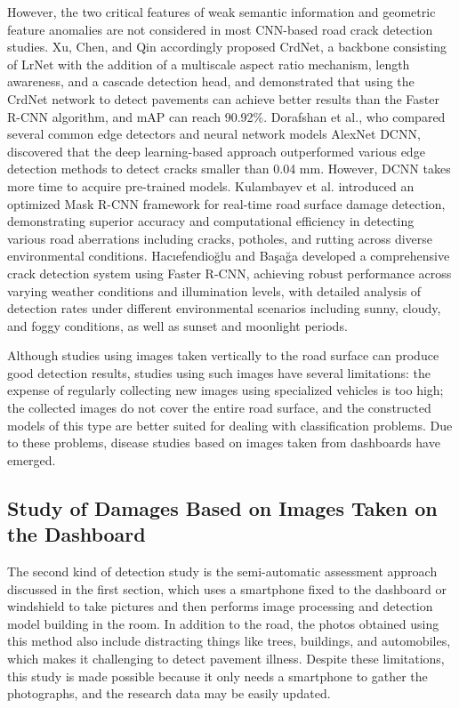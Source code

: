 \documentclass[sensors,article,submit,moreauthors]{Definitions/mdpi}
\begin{document}
    However, the two critical features of weak semantic information and geometric feature anomalies are not considered in most CNN-based road crack detection studies. Xu, Chen, and Qin\citep{xu2021cnn} accordingly proposed CrdNet, a backbone consisting of LrNet\citep{sun2021improving} with the addition of a multiscale aspect ratio mechanism, length awareness, and a cascade detection head, and demonstrated that using the CrdNet network to detect pavements can achieve better results than the Faster R-CNN algorithm\citep{ren2015faster}, and mAP can reach 90.92\%. Dorafshan et al.\citep{dorafshan2018comparison}, who compared several common edge detectors and neural network models AlexNet DCNN\citep{lecun1998gradient}, discovered that the deep learning-based approach outperformed various edge detection methods to detect cracks smaller than 0.04 mm. However, DCNN takes more time to acquire pre-trained models. Kulambayev et al.\citep{kulambayev2023real} introduced an optimized Mask R-CNN framework for real-time road surface damage detection, demonstrating superior accuracy and computational efficiency in detecting various road aberrations including cracks, potholes, and rutting across diverse environmental conditions. Hacıefendioğlu and Başağa\citep{haciefendiouglu2022concrete} developed a comprehensive crack detection system using Faster R-CNN, achieving robust performance across varying weather conditions and illumination levels, with detailed analysis of detection rates under different environmental scenarios including sunny, cloudy, and foggy conditions, as well as sunset and moonlight periods.


    Although studies using images taken vertically to the road surface can produce good detection results, studies using such images have several limitations: the expense of regularly collecting new images using specialized vehicles is too high; the collected images do not cover the entire road surface, and the constructed models of this type are better suited for dealing with classification problems. Due to these problems, disease studies based on images taken from dashboards have emerged.

    \subsection{Study of Damages Based on Images Taken on the Dashboard}


    The second kind of detection study is the semi-automatic assessment approach discussed in the first section, which uses a smartphone fixed to the dashboard or windshield to take pictures and then performs image processing and detection model building in the room. In addition to the road, the photos obtained using this method also include distracting things like trees, buildings, and automobiles, which makes it challenging to detect pavement illness. Despite these limitations, this study is made possible because it only needs a smartphone to gather the photographs, and the research data may be easily updated.
\end{document}
